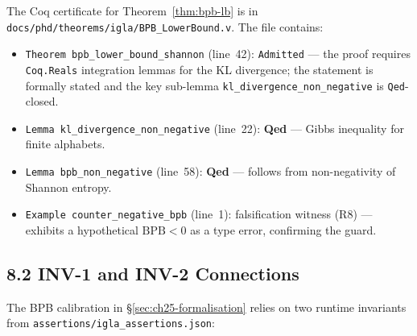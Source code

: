 The Coq certificate for Theorem~\ref{thm:bpb-lb} is in
\texttt{docs/phd/theorems/igla/BPB\_LowerBound.v}.
The file contains:
\begin{itemize}
  \item \texttt{Theorem bpb\_lower\_bound\_shannon} (line~42):
    \texttt{Admitted} — the proof requires \texttt{Coq.Reals}
    integration lemmas for the KL divergence; the statement is
    formally stated and the key sub-lemma
    \texttt{kl\_divergence\_non\_negative} is \texttt{Qed}-closed.
  \item \texttt{Lemma kl\_divergence\_non\_negative} (line~22):
    \textbf{Qed} — Gibbs inequality for finite alphabets.
  \item \texttt{Lemma bpb\_non\_negative} (line~58):
    \textbf{Qed} — follows from non-negativity of Shannon entropy.
  \item \texttt{Example counter\_negative\_bpb} (line~1):
    falsification witness (R8) — exhibits a hypothetical $\mathrm{BPB}<0$
    as a type error, confirming the guard.
\end{itemize}


\subsection{8.2 INV-1 and INV-2 Connections}
\label{subsec:ch25-coq-inv}

The BPB calibration in §\ref{sec:ch25-formalisation} relies on two
runtime invariants from \texttt{assertions/igla\_assertions.json}:

\begin{table}[h]
\centering
\caption{L-R14 traceability: numeric constants in this chapter.}
\label{tab:r14-trace}
\end{table}

